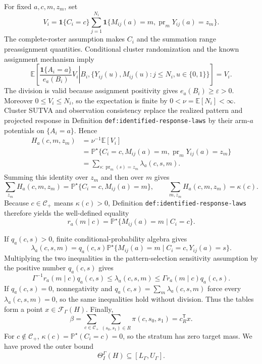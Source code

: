 For fixed \(a,c,m,z_m\), set
\[
V_i=\mathbf 1\{C_i=c\}\sum_{j=1}^{N_i}
 \mathbf 1\{M_{ij}(a)=m,\operatorname{pr}_mY_{ij}(a)=z_m\}.
\]
The complete-roster assumption makes \(C_i\) and the summation range preassignment quantities.  Conditional cluster randomization and the known assignment mechanism imply
\[
\mathbb E\!\left[
 \left.\frac{\mathbf 1\{A_i=a\}}{e_a(B_i)}V_i
 \right|B_i,\{Y_{ij}(u),M_{ij}(u):j\leq N_i,u\in\{0,1\}\}\right]=V_i.
\]
The division is valid because assignment positivity gives \(e_a(B_i)\geq\varepsilon>0\).  Moreover \(0\leq V_i\leq N_i\), so the expectation is finite by \(0<\nu=\mathbb E[N_i]<\infty\).  Cluster SUTVA and observation consistency replace the realized pattern and projected response in Definition \texttt{def:identified-response-laws} by their arm-\(a\) potentials on \(\{A_i=a\}\).  Hence
\[
\begin{aligned}
H_a(c,m,z_m)
 &=\nu^{-1}\mathbb E[V_i]\\
 &=\mathbb P^{\star}\{C_i=c,M_{ij}(a)=m,
      \operatorname{pr}_mY_{ij}(a)=z_m\}\\
 &=\sum_{s:\operatorname{pr}_m(s)=z_m}\lambda_a(c,s,m).
\end{aligned}
\]
Summing this identity over \(z_m\) and then over \(m\) gives
\[
\sum_{z_m}H_a(c,m,z_m)
 =\mathbb P^{\star}\{C_i=c,M_{ij}(a)=m\},
\qquad
\sum_{m,z_m}H_a(c,m,z_m)=\kappa(c).
\]
Because \(c\in\mathcal C_+\) means \(\kappa(c)>0\), Definition \texttt{def:identified-response-laws} therefore yields the well-defined equality
\[
r_a(m\mid c)=\mathbb P^{\star}\{M_{ij}(a)=m\mid C_i=c\}.
\]

If \(q_a(c,s)>0\), finite conditional-probability algebra gives
\[
\lambda_a(c,s,m)
=q_a(c,s)\mathbb P^{\star}\{M_{ij}(a)=m\mid C_i=c,Y_{ij}(a)=s\}.
\]
Multiplying the two inequalities in the pattern-selection sensitivity assumption by the positive number \(q_a(c,s)\) gives
\[
\Gamma^{-1}r_a(m\mid c)q_a(c,s)
\leq\lambda_a(c,s,m)
\leq\Gamma r_a(m\mid c)q_a(c,s).
\]
If \(q_a(c,s)=0\), nonnegativity and \(q_a(c,s)=\sum_m\lambda_a(c,s,m)\) force every \(\lambda_a(c,s,m)=0\), so the same inequalities hold without division.  Thus the tables form a point \(x\in\mathcal F_{\Gamma}(H)\).  Finally,
\[
\beta
=\sum_{c\in\mathcal C_+}\sum_{(s_0,s_1)\in R}\pi(c,s_0,s_1)
=c_R^{\mathsf T}x.
\]
For \(c\notin\mathcal C_+\), \(\kappa(c)=\mathbb P^{\star}(C_i=c)=0\), so the stratum has zero target mass.  We have proved the outer bound
\[
\Theta_I^{\Gamma}(H)\subseteq[L_{\Gamma},U_{\Gamma}].
\]

